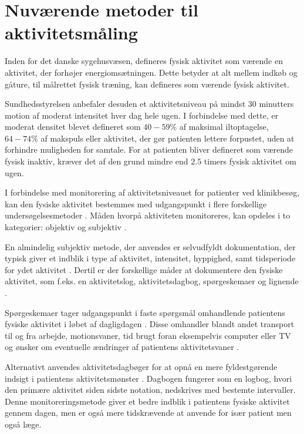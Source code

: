 \section{Nuværende metoder til aktivitetsmåling}

Inden for det danske sygehusvæsen, defineres fysisk aktivitet som værende en aktivitet, der forhøjer energiomsætningen. 
Dette betyder at alt mellem indkøb og gåture, til målrettet fysisk træning, kan defineres som værende fysisk aktivitet.\citep{gupta2013, terkelsen2015}

Sundhedsstyrelsen anbefaler desuden et aktivitetsniveau på mindst 30 minutters motion af moderat intensitet hver dag hele ugen. 
I forbindelse med dette, er moderat densitet blevet defineret som $40-59\%$ af maksimal iltoptagelse, $64-74\%$ af makspuls eller aktivitet, der gør patienten lettere forpustet, uden at forhindre muligheden for samtale. 
For at patienten bliver defineret som værende fysisk inaktiv, kræver det af den grund mindre end $2.5$ timers fysisk aktivitet om ugen.\citep{gupta2013}

I forbindelse med monitorering af aktivitetsniveauet for patienter ved klinikbesøg, kan den fysiske aktivitet bestemmes med udgangspunkt i flere forskellige undersøgelsesmetoder \citep{gupta2013}. 
Måden hvorpå aktiviteten monitoreres, kan opdeles i to kategorier: objektiv og subjektiv \citep{gupta2013, adamo2009}. 


En almindelig subjektiv metode, der anvendes er selvudfyldt dokumentation, der typisk giver et indblik i type af aktivitet, intensitet, hyppighed, samt tidsperiode for ydet aktivitet \citep{adamo2009}. Dertil er der forskellige måder at dokumentere den fysiske aktivitet, som f.eks. en aktivitetslog, aktivitetsdagbog, spørgeskemaer og lignende \citep{adamo2009}. 


Spørgeskemaer tager udgangspunkt i faste spørgsmål omhandlende patientens fysiske aktivitet i løbet af dagligdagen \citep{muller2009}. 
Disse omhandler blandt andet transport til og fra arbejde, motionsvaner, tid brugt foran eksempelvis computer eller TV og ønsker om eventuelle ændringer af patientens aktivitetsvaner \citep{gupta2013, vestergaard2012}. 

Alternativt anvendes aktivitetsdagbøger \citep{muller2009} for at opnå en mere fyldestgørende indsigt i patientens aktivitetsmønster \citep{gupta2013}. 
Dagbogen fungerer som en logbog, hvori den primære aktivitet siden sidste notation, nedskrives med bestemte intervaller. 
Denne monitoreringsmetode giver et bedre indblik i patientens fysiske aktivitet gennem dagen, men er også mere tidskrævende at anvende for især patient men også læge.\citep{gupta2013}

